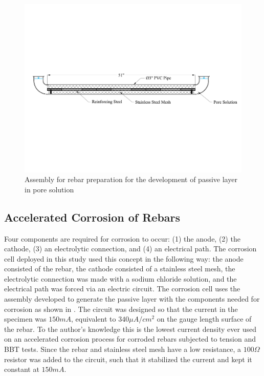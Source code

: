 \begin{figure}[htbp]
	\centering
	\includegraphics[width=1.0\textwidth]{Chapter-3/figs/AnodicPolarization_01}
	\caption{Assembly for rebar preparation for the development of passive layer in pore solution}
	\label{fig:RebarPassivation}
\end{figure}

\subsection{Accelerated Corrosion  of Rebars}

Four components are required for corrosion to occur: (1) the anode, (2) the cathode, (3) an electrolytic connection, and (4) an electrical path. The corrosion cell deployed in this study   used this concept in the following way:  the anode consisted of the rebar, the cathode consisted  of a stainless steel mesh, the electrolytic connection was made with a sodium chloride solution, and the electrical path was forced via an electric circuit. The corrosion cell uses the assembly developed to generate the passive layer with the components needed for corrosion as shown in . The circuit was  designed so that the current in the specimen was $150 mA$, equivalent to $340 \mu A/cm^2$ on the gauge length surface of the rebar. To the author's knowledge this is the lowest current density ever used on an accelerated corrosion process for corroded rebars subjected to tension and BBT tests. Since the rebar and stainless steel mesh have a low resistance, a $100 \Omega$ resistor was added to the circuit, such that it stabilized the current and kept it constant at $150mA$.

